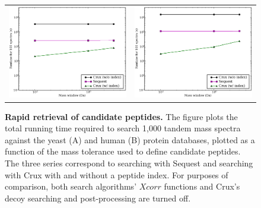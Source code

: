 \documentclass[12pt]{article}
\begin{document}
\begin{figure}
  \centering
  \begin{tabular}{cc}
  \includegraphics[width=3in]{./Images/indexing-yeast.eps} & 
  \includegraphics[width=3in]{./Images/indexing-human.eps} \\
\end{tabular}
  \caption{{\bf Rapid retrieval of candidate peptides.}  The figure
  plots the total running time required to search 1,000 tandem mass
  spectra against the yeast (A) and human (B) protein databases,
  plotted as a function of the mass tolerance used to define candidate
  peptides.  The three series correspond to searching with {\sc
  Sequest} and searching with Crux with and without a peptide index.
  For purposes of comparison, both search algorithms' $Xcorr$
  functions and Crux's decoy searching and post-processing are turned
  off.
  \label{figure:indexing}}
\end{figure}

% 
%
% 
% 
% 
% 
\end{document}

